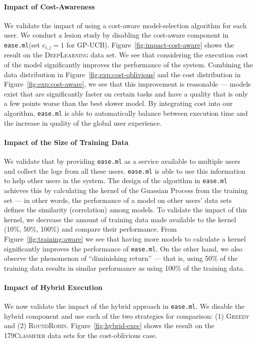 \documentclass[letterpaper]{vldb}
\newcommand{\eml}{\texttt{ease.ml}\xspace}
\begin{document}
\vspace{-1em}
\paragraph*{Impact of Cost-Awareness}
We validate the impact of using 
a cost-aware model-selection algorithm
for each user. We conduct a lesion
study by disabling the cost-aware
component in \eml (set $c_{i,j}=1$
for GP-UCB). Figure~\ref{fig:impact-cost-aware}
shows the result on the \textsc{DeepLearning} data set.
We see that considering the
execution cost of the model significantly
improves the performance of the system.
Combining the data distribution in
Figure~\ref{fig:exp:cost-oblivious}
and the cost distribution in 
Figure~\ref{fig:exp:cost-aware},
we see that this improvement
is reasonable --- models exist
that are significantly faster
on certain tasks and have a quality that
is only a few points worse than the
best slower model. By integrating
cost into our algorithm, \eml is
able to automatically balance between
execution time and the increase in quality of the global
user experience.

\vspace{-1em}
\paragraph*{Impact of the Size of Training Data}

We validate that by providing \eml as
a service available to multiple users
and collect the logs from all these users.
\eml is able to use this information to
help other users in the system. The
design of the algorithm in \eml achieves
this by calculating the kernel of the Guassian Process from the training set --- in other words,
the performance of a model on other users'
data sets defines the similarity (correlation)
among models. To validate the impact
of this kernel, we decrease the amount
of training data made available to
the kernel (10\%, 50\%, 100\%) and compare their performance. 
From Figure~\ref{fig:training:aware}
we see that having more models to 
calculate a kernel significantly improves
the performance of \eml. On the other hand,
we also observe the phenomenon of ``diminishing
return'' --- that is, using 50\% of the
training data results in similar performance
as using 100\% of the training data.

\vspace{-1em}
\paragraph*{Impact of Hybrid Execution}
We now validate the impact of the hybrid 
approach in \eml.
We disable the hybrid component and use each
of the two strategies for comparison: (1)
\textsc{Greedy} and (2) \textsc{RoundRobin}.
Figure~\ref{fig:hybrid-exec} shows the result
on the \textsc{179Classifier} data sets
for the cost-oblivious case.
\end{document}
